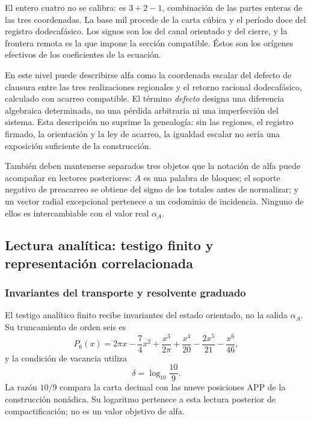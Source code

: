 El entero cuatro no se calibra: es
\(3+2-1\), combinación de las partes enteras de las tres coordenadas.
La base mil procede de la carta cúbica y el período doce del registro dodecafásico. Los
signos son los del canal orientado y del cierre, y la frontera remota es
la que impone la sección compatible. Éstos son los orígenes efectivos de
los coeficientes de la ecuación.

En este nivel puede describirse alfa como la coordenada escalar del
defecto de clausura entre las tres realizaciones regionales y el retorno
racional dodecafásico, calculado con acarreo compatible. El término
\emph{defecto} designa una diferencia algebraica determinada, no una
pérdida arbitraria ni una imperfección del sistema. Esta descripción no
suprime la genealogía: sin las regiones, el registro firmado, la
orientación y la ley de acarreo, la igualdad escalar no sería una
exposición suficiente de la construcción.

También deben mantenerse separados tres objetos que la notación de alfa
puede acompañar en lectores posteriores: \(A\) es una palabra de
bloques; el soporte negativo de preacarreo se obtiene del signo de los
totales antes de normalizar; y un vector radial excepcional pertenece a
un codominio de incidencia. Ninguno de ellos es intercambiable con el
valor real \(\alpha_A\).






\subsection{Lectura analítica: testigo finito y representación correlacionada}
\subsubsection{Invariantes del transporte y resolvente graduado}
\label{subsec:alpha-via-b}

El testigo analítico finito recibe invariantes del estado orientado, no la
salida \(\alpha_A\). Su truncamiento de orden seis es
\begin{equation}
 P_6(x)=2\pi x-\frac74x^2
 +\frac{x^3}{2\pi}
 +\frac{x^4}{20}-\frac{2x^5}{21}-\frac{x^6}{46},
 \label{eq:alpha-p6}
\end{equation}
y la condición de vacancia utiliza
\[
 \delta=\log_{10}\frac{10}{9}.
\]
La razón \(10/9\) compara la carta decimal con las nueve posiciones
APP de la construcción nonádica. Su logaritmo pertenece a esta lectura
posterior de compactificación; no es un valor objetivo de alfa.

